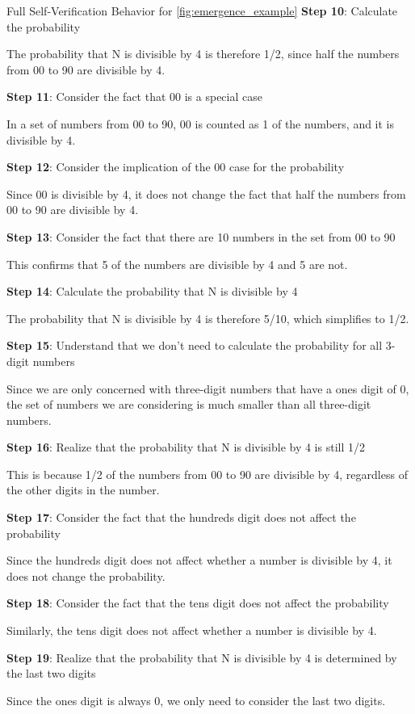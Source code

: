 \begin{promptbox}{Full Self-Verification Behavior for \autoref{fig:emergence_example}}
\textbf{Step 10}: Calculate the probability

The probability that N is divisible by 4 is therefore 1/2, since half the numbers from 00 to 90 are divisible by 4.
 
\textbf{Step 11}: Consider the fact that 00 is a special case

In a set of numbers from 00 to 90, 00 is counted as 1 of the numbers, and it is divisible by 4.
 
\textbf{Step 12}: Consider the implication of the 00 case for the probability

Since 00 is divisible by 4, it does not change the fact that half the numbers from 00 to 90 are divisible by 4.
 
\textbf{Step 13}: Consider the fact that there are 10 numbers in the set from 00 to 90

This confirms that 5 of the numbers are divisible by 4 and 5 are not.
 
\textbf{Step 14}: Calculate the probability that N is divisible by 4

The probability that N is divisible by 4 is therefore 5/10, which simplifies to 1/2.
 
\textbf{Step 15}: Understand that we don't need to calculate the probability for all 3-digit numbers

Since we are only concerned with three-digit numbers that have a ones digit of 0, the set of numbers we are considering is much smaller than all three-digit numbers.
 
\textbf{Step 16}: Realize that the probability that N is divisible by 4 is still 1/2

This is because 1/2 of the numbers from 00 to 90 are divisible by 4, regardless of the other digits in the number.
 
\textbf{Step 17}: Consider the fact that the hundreds digit does not affect the probability

Since the hundreds digit does not affect whether a number is divisible by 4, it does not change the probability.
 
\textbf{Step 18}: Consider the fact that the tens digit does not affect the probability

Similarly, the tens digit does not affect whether a number is divisible by 4.
 
\textbf{Step 19}: Realize that the probability that N is divisible by 4 is determined by the last two digits

Since the ones digit is always 0, we only need to consider the last two digits.
 

\end{promptbox}
